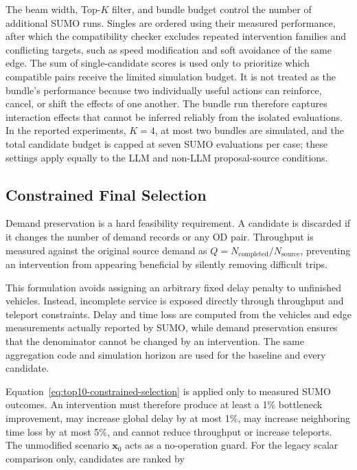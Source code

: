 The beam width, Top-$K$ filter, and bundle budget control the number of
additional SUMO runs.  Singles are ordered using their measured performance, after which the
compatibility checker excludes repeated intervention families and conflicting
targets, such as speed modification and soft avoidance of the same edge.  The
sum of single-candidate scores is used only to prioritize which compatible
pairs receive the limited simulation budget.  It is not treated as the bundle's
performance because two individually useful actions can reinforce, cancel, or
shift the effects of one another.  The bundle run therefore captures interaction
effects that cannot be inferred reliably from the isolated evaluations.  In
the reported experiments, $K=4$, at most two bundles are simulated, and the
total candidate budget is capped at seven SUMO evaluations per case; these
settings apply equally to the LLM and non-LLM proposal-source conditions.

\subsection{Constrained Final Selection}
\label{sec:constrained-selection}

Demand preservation is a hard feasibility requirement.  A candidate is
discarded if it changes the number of demand records or any OD pair.  Throughput
is measured against the original source demand as
$Q=N_{\mathrm{completed}}/N_{\mathrm{source}}$, preventing an intervention from
appearing beneficial by silently removing difficult trips.

This formulation avoids assigning an arbitrary fixed delay penalty to
unfinished vehicles.  Instead, incomplete service is exposed directly through
throughput and teleport constraints.  Delay and time
loss are computed from the vehicles and edge measurements actually reported by
SUMO, while demand preservation ensures that the denominator cannot be changed
by an intervention.  The same aggregation code and simulation horizon are used
for the baseline and every candidate.

Equation~\ref{eq:top10-constrained-selection} is applied only to measured SUMO
outcomes.  An intervention must therefore produce at least a 1\% bottleneck
improvement, may increase global delay by at most 1\%, may increase neighboring
time loss by at most 5\%, and cannot reduce throughput or increase teleports.
The unmodified scenario $\mathbf{x}_0$ acts as a no-operation guard.  For the
legacy scalar comparison only, candidates are ranked by

